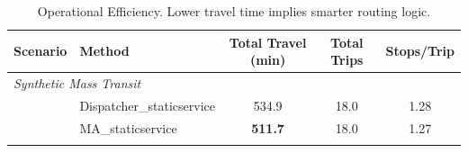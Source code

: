 \begin{table}[h]
\centering
\caption{Operational Efficiency. Lower travel time implies smarter routing logic.}
\label{tab:efficiency}
\begin{tabular}{llccc}
\toprule
\textbf{Scenario} & \textbf{Method} & \textbf{Total Travel (min)} & \textbf{Total Trips} & \textbf{Stops/Trip} \\
\midrule
\multicolumn{5}{l}{\textit{Synthetic Mass Transit}} \\
 & Dispatcher_staticservice & 534.9 & 18.0 & 1.28 \\
 & MA_staticservice & \textbf{511.7} & 18.0 & 1.27 \\
\addlinespace
\bottomrule
\end{tabular}
\end{table}